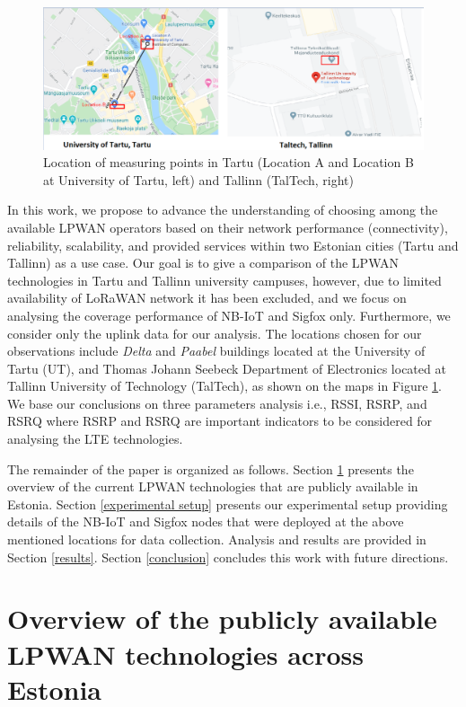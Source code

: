 \documentclass[conference,a4paper,xcolor=table]{IEEEtran}
\begin{document}
\begin{figure}[hb!]
\centering
    \includegraphics[width=\columnwidth]{images/locations.pdf}
    \caption{Location of measuring points in Tartu (Location A and Location B at University of Tartu, left) and Tallinn (TalTech, right)}
    \label{campus}
\end{figure}


In this work, we propose to advance the understanding of choosing among the available LPWAN operators based on their network performance (connectivity), reliability, scalability, and provided services within two Estonian cities (Tartu and Tallinn) as a use case. Our goal is to give a comparison of the LPWAN technologies in Tartu and Tallinn university campuses, however, due to limited availability of LoRaWAN network it has been excluded, and we focus on analysing the coverage performance of NB-IoT and Sigfox only. Furthermore, we consider only the uplink data for our analysis. The locations chosen for our observations include \textit{Delta} and \textit{Paabel} buildings located at the University of Tartu (UT), and Thomas Johann Seebeck Department of Electronics located at Tallinn University of Technology (TalTech), as shown on the maps in Figure \ref{campus}. We base our conclusions on three parameters analysis i.e., RSSI, RSRP, and RSRQ where RSRP and RSRQ are important indicators to be considered for analysing the LTE technologies\cite{afroz2015sinr,basu2019experimental}.\par
The remainder of the paper is organized as follows. Section \ref{Overview of NB-IoT and Sigfox} presents the overview of the current LPWAN technologies that are publicly available in Estonia. Section \ref{experimental setup} presents our experimental setup providing details of the NB-IoT and Sigfox nodes that were deployed at the above mentioned locations for data collection. Analysis and results are provided in Section \ref{results}. Section \ref{conclusion} concludes this work with future directions.

\section{Overview of the publicly available LPWAN technologies across Estonia}\label{Overview of NB-IoT and Sigfox}
\end{document}
